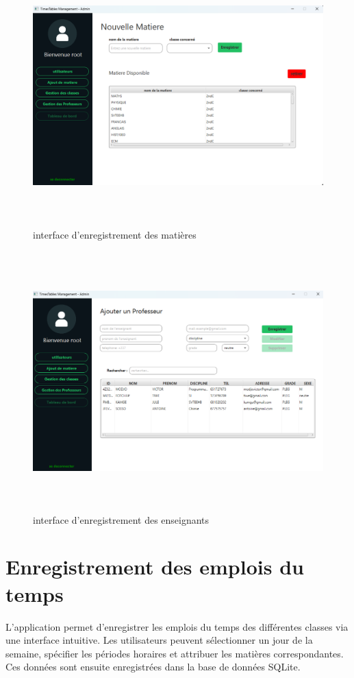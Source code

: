 \documentclass[english,12pt,a4paper]{report}
\begin{document}
\begin{figure}[h]
	\centering
	\includegraphics*[height=10cm, width=12cm]{enregistrementMatiere.png}
	\caption{interface d'enregistrement des matières}
	\label{fig13: enregistrementMatiere}
\end{figure} 

\begin{figure}[h]
	\centering
	\includegraphics*[height=10cm, width=12cm]{enregistrementProfesseur.png}
	\caption{interface d'enregistrement des enseignants}
	\label{fig14: enregistrementProfesseur}
\end{figure} 
\clearpage

\section{Enregistrement des emplois du temps}
L’application permet d’enregistrer les emplois du temps des différentes classes via une interface intuitive. Les utilisateurs peuvent sélectionner un jour de la semaine, spécifier les périodes horaires et attribuer les matières correspondantes. Ces données sont ensuite enregistrées dans la base de données SQLite.
\end{document}
